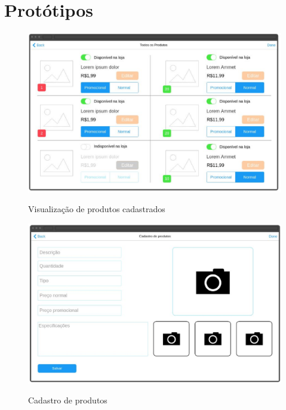 \documentclass[a4paper,12pt]{monografia}
\begin{document}

\section{Protótipos} %
\label{sec:prototipos}

\begin{figure}[H]
\centering
\caption{Visualização de produtos cadastrados}
\centering
\includegraphics[width=12cm]{img/prototipos/produtos-cadastrados.eps}\\
\label{figura:produtos_cadastrados}
\end{figure}

\begin{figure}[H]
\centering
\caption{Cadastro de produtos}
\centering
\includegraphics[width=12cm]{img/prototipos/cadastro-produto.eps}\\
\label{figura:Cadastro_de_Produtos}
\end{figure}
\end{document}
